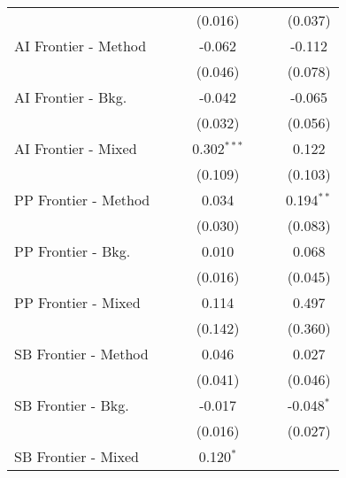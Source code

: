 \begin{tabular}{lcccccc}
                        &              &         & (0.016)       &               &               & (0.037)\\   
   AI Frontier - Method &              &         & -0.062        &               &               & -0.112\\   
                        &              &         & (0.046)       &               &               & (0.078)\\   
   AI Frontier - Bkg.   &              &         & -0.042        &               &               & -0.065\\   
                        &              &         & (0.032)       &               &               & (0.056)\\   
   AI Frontier - Mixed  &              &         & 0.302$^{***}$ &               &               & 0.122\\   
                        &              &         & (0.109)       &               &               & (0.103)\\   
   PP Frontier - Method &              &         & 0.034         &               &               & 0.194$^{**}$\\   
                        &              &         & (0.030)       &               &               & (0.083)\\   
   PP Frontier - Bkg.   &              &         & 0.010         &               &               & 0.068\\   
                        &              &         & (0.016)       &               &               & (0.045)\\   
   PP Frontier - Mixed  &              &         & 0.114         &               &               & 0.497\\   
                        &              &         & (0.142)       &               &               & (0.360)\\   
   SB Frontier - Method &              &         & 0.046         &               &               & 0.027\\   
                        &              &         & (0.041)       &               &               & (0.046)\\   
   SB Frontier - Bkg.   &              &         & -0.017        &               &               & -0.048$^{*}$\\   
                        &              &         & (0.016)       &               &               & (0.027)\\   
   SB Frontier - Mixed  &              &         & 0.120$^{*}$   &               &               &   \\   

\end{tabular}
